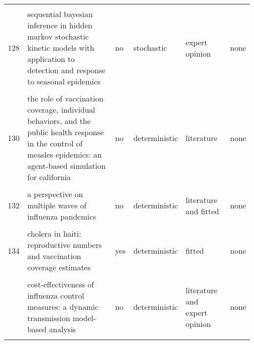 \documentclass[
]{article}
\begin{document}
\begin{landscape}
\begin{longtable}{l>{\raggedright\arraybackslash}p{3cm}l>{\raggedright\arraybackslash}p{3cm}ll}
\cellcolor{gray!6}{127} & \cellcolor{gray!6}{modeling the influence of environment and intervention oncholera in haiti} & \cellcolor{gray!6}{no} & \cellcolor{gray!6}{deterministic} & \cellcolor{gray!6}{literature and fitted} & \cellcolor{gray!6}{none}\\
128 & sequential bayesian inference in hidden markov stochastic kinetic models with application to detection and response to seasonal epidemics & no & stochastic & expert opinion & none\\
\cellcolor{gray!6}{129} & \cellcolor{gray!6}{simulating optimal vaccination times during cholera outbreaks} & \cellcolor{gray!6}{no} & \cellcolor{gray!6}{deterministic} & \cellcolor{gray!6}{literature} & \cellcolor{gray!6}{none}\\
130 & the role of vaccination coverage, individual behaviors, and the public health response in the control of measles epidemics: an agent-based simulation for california & no & deterministic & literature & none\\
\addlinespace
\cellcolor{gray!6}{131} & \cellcolor{gray!6}{time is (still) of the essence: quantifying the impact of emergency meningitis vaccination response in katsina state, nigeria} & \cellcolor{gray!6}{no} & \cellcolor{gray!6}{stochastic} & \cellcolor{gray!6}{literature and expert opinion and fitted} & \cellcolor{gray!6}{data}\\
132 & a perspective on multiple waves of influenza pandemics & no & deterministic & literature and fitted & none\\
\cellcolor{gray!6}{133} & \cellcolor{gray!6}{an optimal control problem arising from a dengue disease transmission model} & \cellcolor{gray!6}{no} & \cellcolor{gray!6}{deterministic} & \cellcolor{gray!6}{expert opinion} & \cellcolor{gray!6}{none}\\
134 & cholera in haiti: reproductive numbers and vaccination coverage estimates & yes & deterministic & fitted & none\\
\cellcolor{gray!6}{135} & \cellcolor{gray!6}{comparing control strategies against foot-and-mouth disease: will vaccination be cost-effective in denmark?} & \cellcolor{gray!6}{no} & \cellcolor{gray!6}{stochastic} & \cellcolor{gray!6}{literature and expert opinion and fitted} & \cellcolor{gray!6}{none}\\
\addlinespace
136 & cost-effectiveness of influenza control measures: a dynamic transmission model-based analysis & no & deterministic & literature and expert opinion & none\\
\cellcolor{gray!6}{137} & \cellcolor{gray!6}{cost-effectiveness of workplace closure and travel restriction for mitigating influenza outbreaks: a network-based simulation} & \cellcolor{gray!6}{no} & \cellcolor{gray!6}{deterministic} & \cellcolor{gray!6}{literature} & \cellcolor{gray!6}{none}\\

\end{longtable}
\end{landscape}
\end{document}
